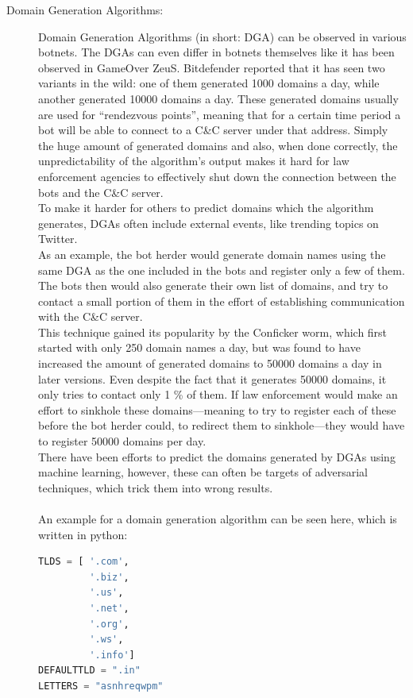 \documentclass[10pt, a4paper, twocolumn]{article} %
\begin{document}
\begin{description}
\item[Domain Generation Algorithms:] %
Domain Generation Algorithms (in short: DGA) can be observed in various botnets. The DGAs can even differ in botnets themselves like it has been observed in GameOver ZeuS. Bitdefender reported that it has seen two variants in the wild: one of them generated 1000 domains a day, while another generated 10000 domains a day\cite{bitdefender}. These generated domains usually are used for ``rendezvous points'', meaning that for a certain time period a bot will be able to connect to a C\&C server under that address. Simply the huge amount of generated domains and also, when done correctly, the unpredictability of the algorithm's output makes it hard for law enforcement agencies to effectively shut down the connection between the bots and the C\&C server. \\
To make it harder for others to predict domains which the algorithm generates, DGAs often include external events, like trending topics on Twitter. \\
As an example, the bot herder would generate domain names using the same DGA as the one included in the bots and register only a few of them. The bots then would also generate their own list of domains, and try to contact a small portion of them in the effort of establishing communication with the C\&C server. \\
This technique gained its popularity by the Conficker worm, which first started with only 250 domain names a day, but was found to have increased the amount of generated domains to 50000 domains a day in later versions. Even despite the fact that it generates 50000 domains, it only tries to contact only 1 \% of them. If law enforcement would make an effort to sinkhole these domains---meaning to try to register each of these before the bot herder could, to redirect them to sinkhole---they would have to register 50000 domains per day. \\
There have been efforts to predict the domains generated by DGAs using machine learning, however, these can often be targets of adversarial techniques, which trick them into wrong results\cite{Sidi2019MaskDGAAB}. \\\\
An example for a domain generation algorithm can be seen here, which is written in python:

\begin{lstlisting}[language=python]
TLDS = [ '.com',
         '.biz', 
         '.us', 
         '.net', 
         '.org', 
         '.ws', 
         '.info']
DEFAULTTLD = ".in"
LETTERS = "asnhreqwpm" 


\end{lstlisting}
\end{description}
\end{document}
